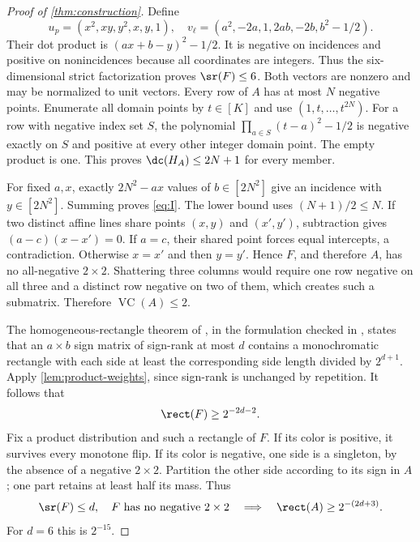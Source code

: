 \begin{proof}[Proof of \cref{thm:construction}]

Define
\[
 u_p=(x^2,xy,y^2,x,y,1),\quad
 v_\ell=(a^2,-2a,1,2ab,-2b,b^2-1/2).
\]
Their dot product is $(ax+b-y)^2-1/2$. It is negative on incidences and positive on nonincidences because all coordinates are integers. Thus the six-dimensional strict factorization proves \mbox{$\sr(F)\le6$}. Both vectors are nonzero and may be normalized to unit vectors. Every row of $A$ has at most $N$ negative points. Enumerate all domain points by $t\in[K]$ and use $(1,t,\ldots,t^{2N})$. For a row with negative index set $S$, the polynomial $\prod_{a\in S}(t-a)^2-1/2$ is negative exactly on $S$ and positive at every other integer domain point. The empty product is one. This proves $\dc(H_A)\le2N+1$ for every member.

For fixed $a,x$, exactly $2N^2-ax$ values of $b\in[2N^2]$ give an incidence with $y\in[2N^2]$. Summing proves \eqref{eq:I}. The lower bound uses $(N+1)/2\le N$. If two distinct affine lines share points $(x,y)$ and $(x',y')$, subtraction gives $(a-c)(x-x')=0$. If $a=c$, their shared point forces equal intercepts, a contradiction. Otherwise $x=x'$ and then $y=y'$. Hence $F$, and therefore $A$, has no all-negative $2\times2$. Shattering three columns would require one row negative on all three and a distinct row negative on two of them, which creates such a submatrix. Therefore $\operatorname{VC}(A)\le2$.

The homogeneous-rectangle theorem of \citet{APP05}, in the formulation checked in \citet[Theorem 1.9]{HHPTZ22}, states that an $a\times b$ sign matrix of sign-rank at most $d$ contains a monochromatic rectangle with each side at least the corresponding side length divided by $2^{d+1}$. Apply \cref{lem:product-weights}, since sign-rank is unchanged by repetition. It follows that
\begin{equation}\label{eq:sharp-rect}
 \rect(F)\ge2^{-2d-2}.
\end{equation}
Fix a product distribution and such a rectangle of $F$. If its color is positive, it survives every monotone flip. If its color is negative, one side is a singleton, by the absence of a negative $2\times2$. Partition the other side according to its sign in $A$; one part retains at least half its mass. Thus
\begin{equation}\label{eq:structural}
 \sr(F)\le d,\quad F\text{ has no negative }2\times2
 \quad\Longrightarrow\quad \rect(A)\ge2^{-(2d+3)}.
\end{equation}
For $d=6$ this is $2^{-15}$. 


\end{proof}
